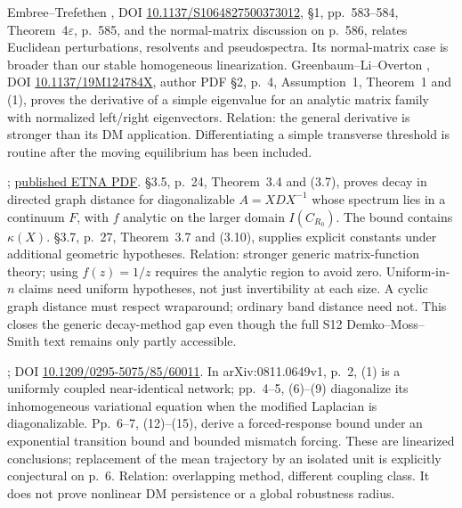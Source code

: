 \begin{description}[style=nextline,leftmargin=0pt,labelwidth=0pt,labelsep=0pt]
\item[S10--S11: matrix perturbation and threshold sensitivity.]
Embree--Trefethen \cite{EmbreeTrefethen2001}, DOI
\href{https://doi.org/10.1137/S1064827500373012}{10.1137/S1064827500373012},
\S1, pp.~583--584, Theorem~4$\varepsilon$, p.~585, and the normal-matrix
discussion on p.~586, relates Euclidean perturbations, resolvents and
pseudospectra. Its normal-matrix case is broader than our stable
homogeneous linearization. Greenbaum--Li--Overton
\cite{GreenbaumLiOverton2020}, DOI
\href{https://doi.org/10.1137/19M124784X}{10.1137/19M124784X},
author PDF \S2, p.~4, Assumption~1, Theorem~1 and (1), proves
the derivative of a simple eigenvalue for an analytic matrix family
with normalized left/right eigenvectors. Relation: the general derivative
is stronger than its DM application. Differentiating a simple transverse
threshold is routine after the moving equilibrium has been included.

\item[S19: Benzi and Razouk (2007), a stronger localization baseline.]
\cite{BenziRazouk2007};
\href{https://www.cs.emory.edu/~benzi/Web_papers/benzi_razouk.pdf}{published ETNA PDF}.
\S3.5, p.~24, Theorem~3.4 and (3.7), proves decay in directed graph
distance for diagonalizable $A=XDX^{-1}$ whose spectrum lies in a
continuum $F$, with $f$ analytic on the larger domain $I(C_{R_0})$.
The bound contains $\kappa(X)$. \S3.7, p.~27, Theorem~3.7 and
(3.10), supplies explicit constants under additional geometric hypotheses.
Relation: stronger generic matrix-function theory; using $f(z)=1/z$
requires the analytic region to avoid zero. Uniform-in-$n$ claims need
uniform hypotheses, not just invertibility at each size. A cyclic graph
distance must respect wraparound; ordinary band distance need not.
This closes the generic decay-method gap even though the full S12
Demko--Moss--Smith text \cite{DemkoMossSmith1984} remains only partly accessible.

\item[S20: Sun, Bollt and Nishikawa (2009).]
\cite{SunBolltNishikawa2009}; DOI
\href{https://doi.org/10.1209/0295-5075/85/60011}{10.1209/0295-5075/85/60011}.
In arXiv:0811.0649v1, p.~2, (1) is a uniformly coupled
near-identical network; pp.~4--5, (6)--(9) diagonalize its
inhomogeneous variational equation when the modified Laplacian is
diagonalizable. Pp.~6--7, (12)--(15), derive a forced-response bound
under an exponential transition bound and bounded mismatch forcing.
These are linearized conclusions; replacement of the mean trajectory by
an isolated unit is explicitly conjectural on p.~6. Relation: overlapping
method, different coupling class. It does not prove nonlinear DM
persistence or a global robustness radius.


\end{description}
